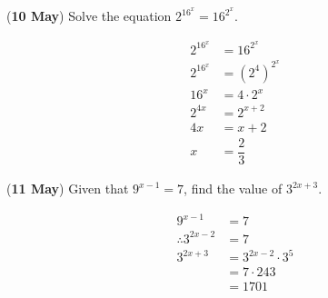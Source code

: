 \documentclass[12pt, answers]{exam}
\renewcommand{\frac}[2]{\dfrac{#1}{#2}}
\begin{document}
\begin{questions}

	\question (\textbf{10 May}) Solve the equation \(2^{16^{x}} = 16^{2^{x}}\).
	\begin{solution}
		\begin{align*}
			2^{16^{x}} & = 16^{2^{x}}                 \\
			2^{16^{x}} & = \left(2^{4}\right)^{2^{x}} \\
			16^{x}     & = 4 \cdot 2^{x}              \\
			2^{4x}     & = 2^{x + 2}                  \\
			4x         & = x + 2                      \\
			x          & = \frac{2}{3}
		\end{align*}
	\end{solution}

	\question (\textbf{11 May}) Given that \(9^{x-1} = 7\), find the value of \(3^{2x+3}\).
	\begin{solution}
		\begin{align*}
			9^{x - 1}             & = 7                      \\
			\therefore 3^{2x - 2} & = 7                      \\
			3^{2x+3}              & = 3^{2x - 2} \cdot 3^{5} \\
			                      & = 7 \cdot 243            \\
			                      & = 1701
		\end{align*}
	\end{solution}
\end{questions}
\end{document}
